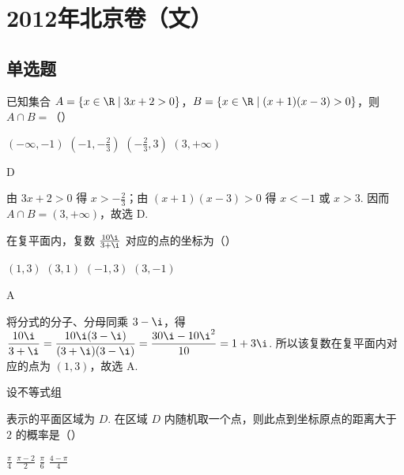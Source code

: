 \chapter{2012年北京卷（文）}

\section{单选题}

\begin{problem}
已知集合 \(A = \{x \in \R \mid 3x + 2 > 0\}\)，\(B = \{x \in \R \mid (x + 1)(x - 3) > 0\}\)，则 \(A \cap B =\)（\quad）

\choices
    {\((-\infty, -1)\)}
    {\(\left(-1, -\frac{2}{3}\right)\)}
    {\(\left(-\frac{2}{3}, 3\right)\)}
    {\((3, +\infty)\)}
\end{problem}

\begin{answer}
D
\end{answer}

\begin{solution}
由 \(3x+2>0\) 得 \(x>-\frac{2}{3}\)；由 \((x+1)(x-3)>0\) 得 \(x<-1\) 或 \(x>3\). 因而 \(A\cap B=(3,+\infty)\)，故选 D.
\end{solution}

\begin{problem}
在复平面内，复数 \(\frac{10\i}{3 + \i}\) 对应的点的坐标为（\quad）

\choices
    {\((1,3)\)}
    {\((3,1)\)}
    {\((-1,3)\)}
    {\((3,-1)\)}
\end{problem}

\begin{answer}
A
\end{answer}

\begin{solution}
将分式的分子、分母同乘 \(3-\i\)，得
\(\dfrac{10\i}{3+\i}=\dfrac{10\i(3-\i)}{(3+\i)(3-\i)}=\dfrac{30\i-10\i^2}{10}=1+3\i\).
所以该复数在复平面内对应的点为 \((1,3)\)，故选 A.
\end{solution}

\begin{problem}
设不等式组

表示的平面区域为 \(D\). 在区域 \(D\) 内随机取一个点，则此点到坐标原点的距离大于 \(2\) 的概率是（\quad）

\choices
    {\(\frac{\pi}{4}\)}
    {\(\frac{\pi - 2}{2}\)}
    {\(\frac{\pi}{6}\)}
    {\(\frac{4 - \pi}{4}\)}
\end{problem}

